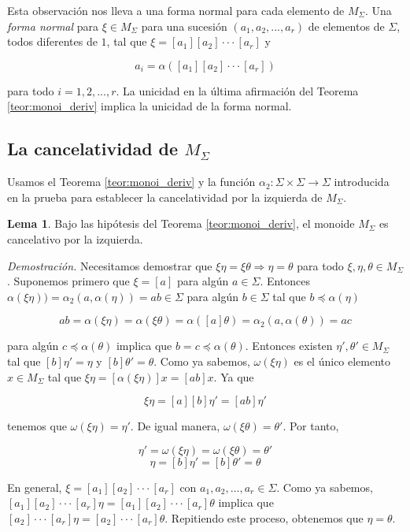 \documentclass[12pt]{article}
\theoremstyle{definition}
\newtheorem{lema}{Lema}[section]
\begin{document}
Esta observación nos lleva a una forma normal para cada elemento de $M_\Sigma$. Una \textit{forma normal} para $\xi\in M_\Sigma$ para una sucesión $(a_1,a_2,...,a_r)$ de elementos de $\Sigma$, todos diferentes de $1$, tal que $\xi=[a_1][a_2]\cdot\cdot\cdot[a_r]$ y 

$$a_i=\alpha([a_1][a_2]\cdot\cdot\cdot[a_r])$$

para todo $i=1,2,...,r$. La unicidad en la última afirmación del Teorema \ref{teor:monoi_deriv} implica la unicidad de la forma normal.


\subsection{La cancelatividad de $M_\Sigma$}

Usamos el Teorema \ref{teor:monoi_deriv} y la función $\alpha_2:\Sigma\times\Sigma\rightarrow\Sigma$ introducida en la prueba para establecer la cancelatividad por la izquierda de $M_\Sigma$.

\begin{lema}
Bajo las hipótesis del Teorema \ref{teor:monoi_deriv}, el monoide $M_\Sigma$ es cancelativo por la izquierda.
\label{lema:cancel}
\end{lema}

\textit{Demostración.} Necesitamos demostrar que $\xi\eta=\xi\theta\Rightarrow\eta=\theta$ para todo $\xi,\eta,\theta\in M_\Sigma$. Suponemos primero que $\xi=[a]$ para algún $a\in\Sigma$. Entonces $\alpha(\xi\eta))=\alpha_2(a,\alpha(\eta))=ab\in\Sigma$ para algún $b\in\Sigma$ tal que $b\preceq \alpha(\eta)$

$$ab=\alpha(\xi\eta)=\alpha(\xi\theta)=\alpha([a]\theta)=\alpha_2(a,\alpha(\theta))=ac$$

para algún $c\preceq\alpha(\theta)$ implica que $b=c\preceq\alpha(\theta)$. Entonces existen $\eta',\theta'\in M_\Sigma$ tal que $[b]\eta'=\eta$ y $[b]\theta'=\theta$. Como ya sabemos, $\omega(\xi\eta)$ es el único elemento $x\in M_\Sigma$ tal que $\xi\eta=[\alpha(\xi\eta)]x=[ab]x$. Ya que

$$\xi\eta=[a][b]\eta'=[ab]\eta'$$

tenemos que $\omega(\xi\eta) = \eta'$. De igual manera, $\omega(\xi\theta)=\theta'$. Por tanto,

$$\eta'=\omega(\xi\eta)=\omega(\xi\theta)=\theta'$$
$$\eta=[b]\eta'=[b]\theta'=\theta$$

En general, $\xi=[a_1][a_2]\cdot\cdot\cdot[a_r]$ con $a_1,a_2,...,a_r\in\Sigma$. Como ya sabemos, $[a_1][a_2]\cdot\cdot\cdot[a_r]\eta=[a_1][a_2]\cdot\cdot\cdot[a_r]\theta$ implica que $[a_2]\cdot\cdot\cdot[a_r]\eta=[a_2]\cdot\cdot\cdot[a_r]\theta$. Repitiendo este proceso, obtenemos que $\eta=\theta$.
\end{document}
